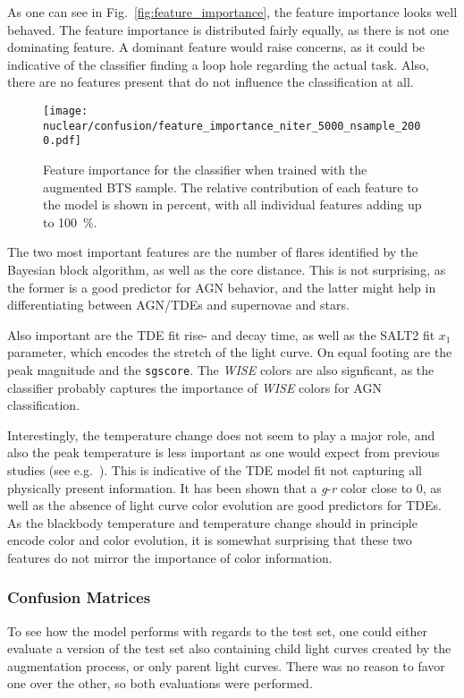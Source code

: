 As one can see in Fig.~\ref{fig:feature_importance}, the feature importance looks well behaved. The feature importance is distributed fairly equally, as there is not one dominating feature. A dominant feature would raise concerns, as it could be indicative of the classifier finding a loop hole regarding the actual task. Also, there are no features present that do not influence the classification at all.

\begin{figure}[htpb]
  \texttt{[image: nuclear/confusion/feature\_importance\_niter\_5000\_nsample\_2000.pdf]}
  \caption[Feature importance]{Feature importance for the classifier when trained with the augmented BTS sample. The relative contribution of each feature to the model is shown in percent, with all individual features adding up to \SI{100}{\percent}.}
\end{figure}

The two most important features are the number of flares identified by the Bayesian block algorithm, as well as the core distance. This is not surprising, as the former is a good predictor for AGN behavior, and the latter might help in differentiating between AGN/TDEs and supernovae and stars.

Also important are the TDE fit rise- and decay time, as well as the SALT2 fit $x_1$ parameter, which encodes the stretch of the light curve. On equal footing are the peak magnitude and the \texttt{sgscore}. The \textit{WISE} colors are also signficant, as the classifier probably captures the importance of \textit{WISE} colors for AGN classification.

Interestingly, the temperature change does not seem to play a major role, and also the peak temperature is less important as one would expect from previous studies (see e.g.~\cite{Velzen2021a}). This is indicative of the TDE model fit not capturing all physically present information. It has been shown that a \textit{g}-\textit{r} color close to 0, as well as the absence of light curve color evolution are good predictors for TDEs. As the blackbody temperature and temperature change should in principle encode color and color evolution, it is somewhat surprising that these two features do not mirror the importance of color information.

\subsubsection{Confusion Matrices}\label{confusion_matrices}
To see how the model performs with regards to the test set, one could either evaluate a version of the test set also containing child light curves created by the augmentation process, or only parent light curves. There was no reason to favor one over the other, so both evaluations were performed.

